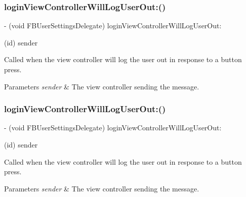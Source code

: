 \subsubsection{\texorpdfstring{login\+View\+Controller\+Will\+Log\+User\+Out\+:()}{loginViewControllerWillLogUserOut:()}\hspace{0.1cm}{\footnotesize\ttfamily [3/5]}}
{\footnotesize\ttfamily -\/ (void F\+B\+User\+Settings\+Delegate) login\+View\+Controller\+Will\+Log\+User\+Out\+: \begin{DoxyParamCaption}\item[{(id)}]{sender }\end{DoxyParamCaption}\hspace{0.3cm}{\ttfamily [optional]}}

Called when the view controller will log the user out in response to a button press.


\begin{DoxyParams}{Parameters}
{\em sender} & The view controller sending the message. \\
\hline
\end{DoxyParams}
\mbox{\label{protocolFBUserSettingsDelegate_01-p_a194e956d188265f18ec887255d90b7c8}} 
\subsubsection{\texorpdfstring{login\+View\+Controller\+Will\+Log\+User\+Out\+:()}{loginViewControllerWillLogUserOut:()}\hspace{0.1cm}{\footnotesize\ttfamily [4/5]}}
{\footnotesize\ttfamily -\/ (void F\+B\+User\+Settings\+Delegate) login\+View\+Controller\+Will\+Log\+User\+Out\+: \begin{DoxyParamCaption}\item[{(id)}]{sender }\end{DoxyParamCaption}\hspace{0.3cm}{\ttfamily [optional]}}

Called when the view controller will log the user out in response to a button press.


\begin{DoxyParams}{Parameters}
{\em sender} & The view controller sending the message. \\
\hline
\end{DoxyParams}
\mbox{\label{protocolFBUserSettingsDelegate_01-p_a194e956d188265f18ec887255d90b7c8}} 
